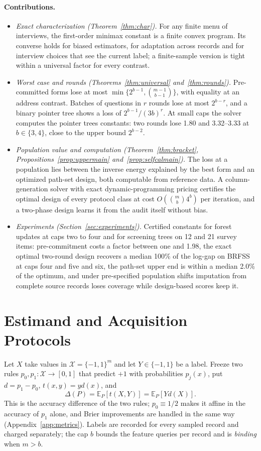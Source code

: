 \documentclass{article}
\newcommand{\E}{\mathbb{E}}
\newcommand{\X}{\mathcal X}
\begin{document}
\paragraph{Contributions.}
\begin{itemize}\itemsep1pt\parskip0pt
\item \emph{Exact characterization (Theorem~\ref{thm:char}).} For any finite menu of interviews, the first-order minimax constant is a finite convex program. Its converse holds for biased estimators, for adaptation across records and for interview choices that see the current label; a finite-sample version is tight within a universal factor for every contrast.
\item \emph{Worst case and rounds (Theorems~\ref{thm:universal} and~\ref{thm:rounds}).} Pre-committed forms lose at most $\min\{2^{b-1},\binom{m-1}{b-1}\}$, with equality at an address contrast. Batches of questions in $r$ rounds lose at most $2^{b-r}$, and a binary pointer tree shows a loss of $2^{b-1}/(3b)^r$. At small caps the solver computes the pointer tree\textquotesingle s constants: two rounds lose 1.80 and 3.32--3.33 at $b\in\{3,4\}$, close to the upper bound $2^{b-2}$.
\item \emph{Population value and computation (Theorem~\ref{thm:bracket}, Propositions~\ref{prop:uppermain} and~\ref{prop:selfcalmain}).} The loss at a population lies between the inverse energy explained by the best form and an optimized path-set design, both computable from reference data. A column-generation solver with exact dynamic-programming pricing certifies the optimal design of every protocol class at cost $O(\binom mb4^b)$ per iteration, and a two-phase design learns it from the audit itself without bias.
\item \emph{Experiments (Section~\ref{sec:experiments}).} Certified constants for forest updates at caps two to four and for screening trees on 12 and 21 survey items: pre-commitment costs a factor between one and 1.98, the exact optimal two-round design recovers a median 100\% of the log-gap on BRFSS at caps four and five and six, the path-set upper end is within a median 2.0\% of the optimum, and under pre-specified population shifts imputation from complete source records loses coverage while design-based scores keep it.
\end{itemize}

\section{Estimand and Acquisition Protocols}\label{sec:setup}
Let $X$ take values in $\X=\{-1,1\}^m$ and let $Y\in\{-1,1\}$ be a label. Freeze two rules $p_0,p_1:\X\to[0,1]$ that predict $+1$ with probabilities $p_j(x)$, put $d=p_1-p_0$, $t(x,y)=yd(x)$, and
\begin{equation}
 \Delta(P)=\E_P[t(X,Y)]=\E_P[Yd(X)].\label{eq:gain}
\end{equation}
This is the accuracy difference of the two rules; $p_0\equiv1/2$ makes it affine in the accuracy of $p_1$ alone, and Brier improvements are handled in the same way (Appendix~\ref{app:metrics}). Labels are recorded for every sampled record and charged separately; the cap $b$ bounds the feature queries per record and is \emph{binding} when $m>b$.
\end{document}
